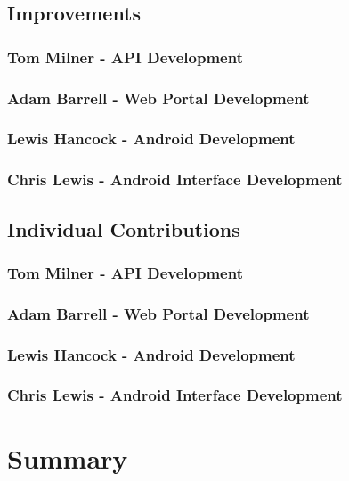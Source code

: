 \documentclass[11pt,a4paper]{report}
\begin{document}
\section{Improvements}
\label{sec:improvements}

\subsection{Tom Milner - API Development}
\subsection{Adam Barrell - Web Portal Development}
\subsection{Lewis Hancock - Android Development}
\subsection{Chris Lewis - Android Interface Development}

\section{Individual Contributions}
\label{sec:individual-contributions}

\subsection{Tom Milner - API Development}
\subsection{Adam Barrell - Web Portal Development}
\subsection{Lewis Hancock - Android Development}
\subsection{Chris Lewis - Android Interface Development}

\chapter*{Summary}
\label{sec:summary}

\newpage



\appendix
\end{document}
